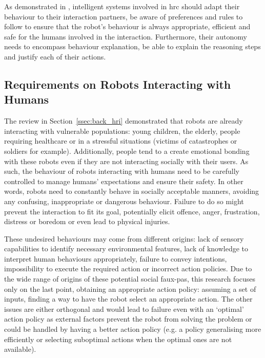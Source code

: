 	As demonstrated in \cite{munzer2017efficient}, intelligent systems involved in \gls{hrc} should adapt their behaviour to their interaction partners, be aware of preferences and rules to follow to ensure that the robot's behaviour is always appropriate, efficient and safe for the humans involved in the interaction. Furthermore, their autonomy needs to encompass behaviour explanation, be able to explain the reasoning steps and justify each of their actions.

\subsection{Requirements on Robots Interacting with Humans} \label{ssec:back_constraints}
    The review in Section~\ref{ssec:back_hri} demonstrated that robots are already interacting with vulnerable populations: young children, the elderly, people requiring healthcare or in a stressful situations (victims of catastrophes or soldiers for example). Additionally, people tend to a create emotional bonding with these robots even if they are not interacting socially with their users. As such, the behaviour of robots interacting with humans need to be carefully controlled to manage humans' expectations and ensure their safety. In other words, robots need to constantly behave in socially acceptable manners, avoiding any confusing, inappropriate or dangerous behaviour. Failure to do so might prevent the interaction to fit its goal, potentially elicit offence, anger, frustration, distress or boredom or even lead to physical injuries. 
    
    These undesired behaviours may come from different origins: lack of sensory capabilities to identify necessary environmental features, lack of knowledge to interpret human behaviours appropriately, failure to convey intentions, impossibility to execute the required action or incorrect action policies. Due to the wide range of origins of these potential social faux-pas, this research focuses only on the last point, obtaining an appropriate action policy: assuming a set of inputs, finding a way to have the robot select an appropriate action. The other issues are either orthogonal and would lead to failure even with an `optimal' action policy as external factors prevent the robot from solving the problem or could be handled by having a better action policy (e.g. a policy generalising more efficiently or selecting suboptimal actions when the optimal ones are not available).%
    
